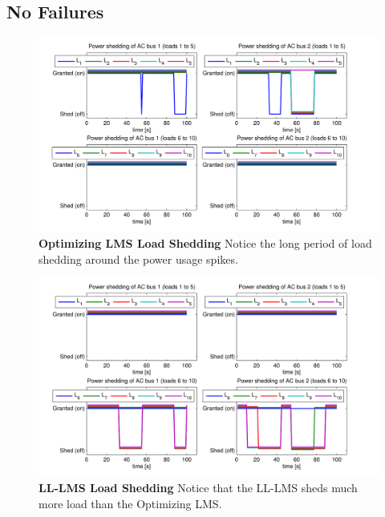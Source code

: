 \documentclass{acm_proc_article-sp}
\begin{document}
\subsection{No Failures}
\begin{figure}[htb]
  \centering
  \includegraphics[width=\columnwidth]{figures/lshlnofail}
  \caption{\textbf{Optimizing LMS Load Shedding} Notice the long
  period of load shedding around the power usage spikes.}
  \label{fig:lshlnofail}
\end{figure}
\begin{figure}[htb]
  \centering
  \includegraphics[width=0.9\columnwidth]{figures/lsllnofail}
  \caption{\textbf{LL-LMS Load Shedding} Notice that the 
  LL-LMS sheds much more load than the Optimizing LMS.}
  \label{fig:lsllnofail}
\end{figure}
\end{document}
